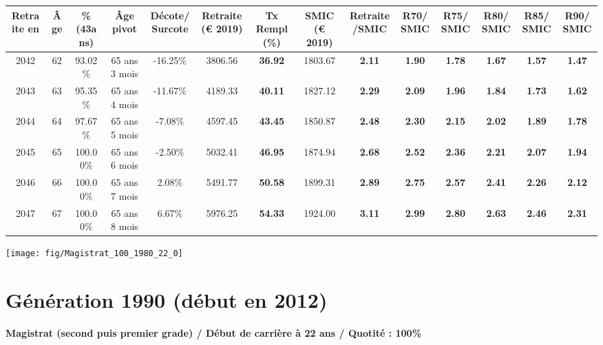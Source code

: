 \begin{adjustbox}{max width=\textwidth} 
\begin{tabular}[htb]{|c|c||c|c|c||c|c||c|c||c|c|c|c|c|} 
\hline 
 Retraite en &  Âge &  \%(43ans) &  Âge pivot &  Décote/Surcote &  Retraite (\euro{} 2019) &  Tx Rempl(\%) &  SMIC (\euro{} 2019) &  Retraite/SMIC &  R70/SMIC &  R75/SMIC &  R80/SMIC &  R85/SMIC &  R90/SMIC \\ 
\hline \hline 
 2042 &  62 &  93.02\% &  65 ans 3 mois &  -16.25\% &  3806.56 &  {\bf 36.92} &  1803.67 &  {\bf 2.11} &  {\bf 1.90} &  {\bf 1.78} &  {\bf 1.67} &  {\bf 1.57} &  {\bf 1.47} \\ 
\hline 
 2043 &  63 &  95.35\% &  65 ans 4 mois &  -11.67\% &  4189.33 &  {\bf 40.11} &  1827.12 &  {\bf 2.29} &  {\bf 2.09} &  {\bf 1.96} &  {\bf 1.84} &  {\bf 1.73} &  {\bf 1.62} \\ 
\hline 
 2044 &  64 &  97.67\% &  65 ans 5 mois &  -7.08\% &  4597.45 &  {\bf 43.45} &  1850.87 &  {\bf 2.48} &  {\bf 2.30} &  {\bf 2.15} &  {\bf 2.02} &  {\bf 1.89} &  {\bf 1.78} \\ 
\hline 
 2045 &  65 &  100.00\% &  65 ans 6 mois &  -2.50\% &  5032.41 &  {\bf 46.95} &  1874.94 &  {\bf 2.68} &  {\bf 2.52} &  {\bf 2.36} &  {\bf 2.21} &  {\bf 2.07} &  {\bf 1.94} \\ 
\hline 
 2046 &  66 &  100.00\% &  65 ans 7 mois &  2.08\% &  5491.77 &  {\bf 50.58} &  1899.31 &  {\bf 2.89} &  {\bf 2.75} &  {\bf 2.57} &  {\bf 2.41} &  {\bf 2.26} &  {\bf 2.12} \\ 
\hline 
 2047 &  67 &  100.00\% &  65 ans 8 mois &  6.67\% &  5976.25 &  {\bf 54.33} &  1924.00 &  {\bf 3.11} &  {\bf 2.99} &  {\bf 2.80} &  {\bf 2.63} &  {\bf 2.46} &  {\bf 2.31} \\ 
\hline 
\hline 
\end{tabular} 
\end{adjustbox} 
 
 \vspace{0.1cm} 

 {\hspace{-2.2cm}\texttt{[image: fig/Magistrat\_100\_1980\_22\_0]}} 

\newpage 
 
\section{Génération 1990 (début en 2012)\label{Magistrat_100_1990_22_0}} 
 
{\bf \noindent Magistrat (second puis premier grade) / Début de carrière à 22 ans / Quotité : 100\%}  ~ 

